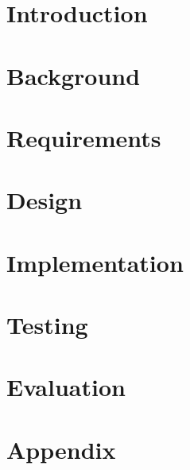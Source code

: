 \documentclass[a4paper,twoside,10pt]{report}
\begin{document}
\newpage


\pagestyle{fancy}
\fancyfoot{}
\fancyfoot[LE,RO]{\thepage}



\chapter{Introduction}


\chapter{Background}


\chapter{Requirements}


\chapter{Design}


\chapter{Implementation}


\chapter{Testing}


\chapter{Evaluation}


\appendix
\chapter{Appendix}


\renewcommand\bibname{References}
\printbibliography{}
\end{document}
